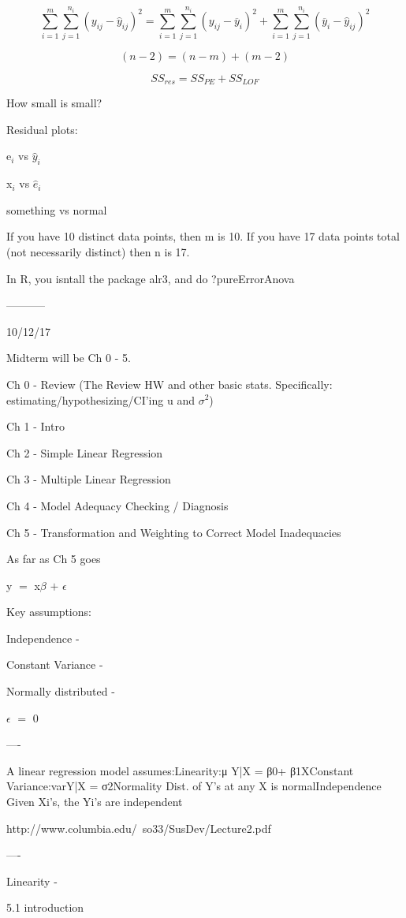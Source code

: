 \documentclass[12pt]{extarticle}
\newcommand{\mt}[1]{\ensuremath{#1}}
\newcommand{\ep}{\mt{\epsilon} }         %
\newcommand{\bta}{\mt{\beta} }
\newcommand{\ps}{\mt{\operatorname{+}} }
\newcommand{\eql}{ \mt{\operatorname{=}} }
\newcommand{\uw}[2]{#1\mt{_{#2}}}
\newcommand{\eqn}[1]{\[#1\]}
\newcommand{\txt}[1]{\text{#1}} %
\newcommand{\mn}[1]{\mt{\overline{#1}}}
\newcommand{\ssq}{\mt{\sigma^2}}
\newcommand{\exv}[1]{\txt{E[}#1\txt{]}}
\begin{document}
\eqn{\sum_{i = 1}^m\sum_{j = 1}^{n_i} (y_{ij} - \hat y_{ij})^2 = \sum_{i = 1}^m\sum_{j = 1}^{n_i} (y_{ij} - \mn{y}_{i})^2 + \sum_{i = 1}^m\sum_{j = 1}^{n_i} (\mn{y}_{i} - \hat y_{ij})^2}

\eqn{(n - 2) = (n - m) + (m - 2)}

\eqn{SS_{res} = SS_{PE} + SS_{LOF}}

How small is small?

Residual plots:

\uw{e}{i} vs $\hat y_i$

\uw{x}{i} vs $\hat e_i$

something vs normal 

If you have 10 distinct data points, then m is 10. If you have 17 data points total (not necessarily distinct) then n is 17.

In R, you isntall the package alr3, and do ?pureErrorAnova

-----------

10/12/17

Midterm will be Ch 0 - 5. 

Ch 0 - Review (The Review HW and other basic stats. Specifically: estimating/hypothesizing/CI'ing u and \ssq)

Ch 1 - Intro

Ch 2 - Simple Linear Regression

Ch 3 - Multiple Linear Regression

Ch 4 - Model Adequacy Checking / Diagnosis

Ch 5 - Transformation and Weighting to Correct Model Inadequacies

As far as Ch 5 goes

y \eql x\bta \ps \ep

Key assumptions:

Independence - 

Constant Variance -

Normally distributed - 

\exv{\ep} \eql 0

----

A linear regression model assumes:Linearity:μ {Y|X} = β0+ β1XConstant Variance:var{Y|X} = σ2Normality Dist. of Y’s at any X is normalIndependence Given Xi’s, the Yi’s are independent

http://www.columbia.edu/~so33/SusDev/Lecture2.pdf

----

Linearity - 

5.1 introduction
\end{document}
